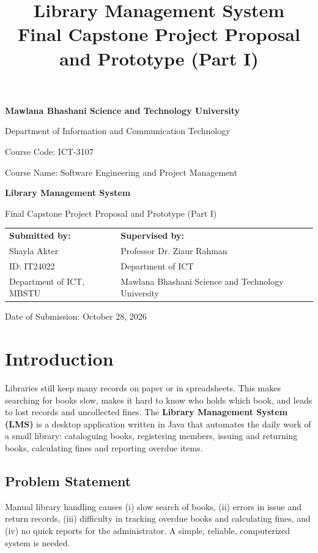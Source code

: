 \documentclass[12pt,a4paper]{article}
\title{\textbf{Library Management System}\\[4pt]\large Final Capstone Project Proposal and Prototype (Part I)}
\author{}
\date{}
\begin{document}
\begin{titlepage}
\centering
{\Large\textbf{Mawlana Bhashani Science and Technology University}\par}
\vspace{0.3cm}
{\large Department of Information and Communication Technology\par}
\vspace{2cm}
{\Large Course Code: ICT-3107\par}
{\Large Course Name: Software Engineering and Project Management\par}
\vspace{2cm}
{\huge\bfseries Library Management System\par}
\vspace{0.4cm}
{\Large Final Capstone Project Proposal and Prototype (Part I)\par}
\vfill
\begin{tabular}{@{}p{}p{}@{}}
\textbf{Submitted by:} & \textbf{Supervised by:}\\[4pt]
Shayla Akter & Professor Dr. Ziaur Rahman\\
ID: IT24022 & Department of ICT\\
Department of ICT, MBSTU & Mawlana Bhashani Science and Technology University
\end{tabular}
\vspace{1.5cm}

Date of Submission: October 28, 2026
\end{titlepage}
\tableofcontents
\newpage

\section{Introduction}
Libraries still keep many records on paper or in spreadsheets. This makes searching for books slow, makes it hard to know who holds which book, and leads to lost records and uncollected fines. The \textbf{Library Management System (LMS)} is a desktop application written in Java that automates the daily work of a small library: cataloguing books, registering members, issuing and returning books, calculating fines and reporting overdue items.

\subsection{Problem Statement}
Manual library handling causes (i) slow search of books, (ii) errors in issue and return records, (iii) difficulty in tracking overdue books and calculating fines, and (iv) no quick reports for the administrator. A simple, reliable, computerized system is needed.
\end{document}
